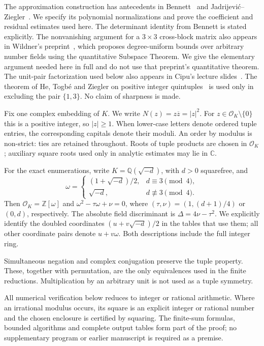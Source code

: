 \documentclass[12pt]{article}
\numberwithin{equation}{section}
\begin{document}
The approximation construction has antecedents in Bennett~\cite{Bennett96}
and Jadrijevi\'c--Ziegler~\cite{JZ}. We specify its polynomial
normalizations and prove the coefficient and residual estimates used
here. The determinant identity from Bennett is stated explicitly.
The nonvanishing argument for a $3\times3$ cross-block matrix also
appears in Wildner's preprint~\cite{W}, which proposes degree-uniform
bounds over arbitrary number fields using the quantitative Subspace
Theorem. We give the elementary argument needed here in full and do
not use that preprint's quantitative theorem. The unit-pair
factorization used below also appears in Cipu's lecture
slides~\cite{Cipu25}. The theorem of He, Togb\'e and Ziegler on positive
integer quintuples~\cite{HTZ} is used only in excluding the pair
$\{1,3\}$. No claim of sharpness is made.

Fix one complex embedding of $K$. We write $N(z)=z\overline z=|z|^2$.
For $z\in\mathcal O_K\setminus\{0\}$ this is a positive integer, so
$|z|\ge1$. When lower-case letters denote ordered tuple entries,
the corresponding capitals denote their moduli. An order by modulus
is non-strict: ties are retained throughout. Roots of tuple products
are chosen in $\mathcal O_K$; auxiliary square roots used only in
analytic estimates may lie in $\mathbb C$.

For the exact enumerations, write $K=\mathbb Q(\sqrt{-d})$, with
$d>0$ squarefree, and
\[
 \omega=\begin{cases}(1+\sqrt{-d})/2,&d\equiv3\pmod4,\\
                     \sqrt{-d},&d\not\equiv3\pmod4.
       \end{cases}
\]
Then $\mathcal O_K=\mathbb Z[\omega]$ and
$\omega^2-\tau\omega+\nu=0$, where
$(\tau,\nu)=(1,(d+1)/4)$ or $(0,d)$, respectively.
The absolute field discriminant is $\Delta=4\nu-\tau^2$.
We explicitly identify the doubled coordinates
$(u+v\sqrt{-d})/2$ in the tables that use them; all other coordinate
pairs denote $u+v\omega$. Both descriptions include the full integer ring.

Simultaneous negation and complex conjugation preserve the tuple
property. These, together with permutation, are the only equivalences
used in the finite reductions. Multiplication by an arbitrary unit
is not used as a tuple symmetry.

All numerical verification below reduces to integer or rational
arithmetic. Where an irrational modulus occurs, its square is an
explicit integer or rational number and the chosen enclosure is
certified by squaring. The finite-sum formulas, bounded algorithms
and complete output tables form part of the proof; no supplementary
program or earlier manuscript is required as a premise.
\end{document}
